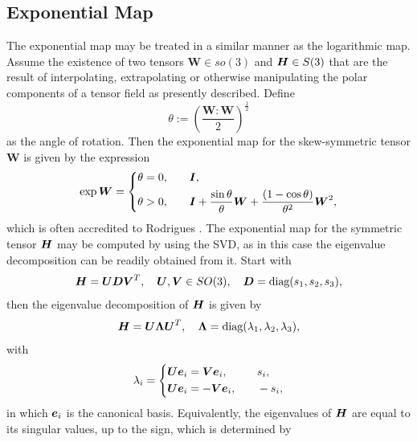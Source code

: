 \documentclass[12pt]{article}
\newcommand{\mbs}[1]{\boldsymbol{#1}}
\def\bD{{\mbs{D}}} \def\bE{{\mbs{E}}} \def\bF{{\mbs{F}}}
\def\bV{{\mbs{V}}} \def\bW{{\mbs{W}}} \def\bX{{\mbs{X}}}
\def\bLambda{{\mbs{\Lambda}}}
\begin{document}
\subsection{Exponential Map}

The exponential map may be treated in a similar manner as the logarithmic map.
Assume the existence of two tensors $\bW \in so(3)$ and $\bH \in S(3)$ that are the result of
interpolating, extrapolating or otherwise manipulating the polar components of a
tensor field as presently described. Define
\begin{equation}
  \theta := \left( \frac{\bW : \bW}{2} \right)^{\frac{1}{2}}
  \label{eq:angle-as-norm-skew}
\end{equation}
as the angle of rotation. Then the exponential map for the skew-symmetric tensor
$\bW$ is given by the expression
\begin{align}
  \exp \bW =
  \left\{
    \begin{aligned}
    & \theta = 0, & \quad & \bI,
    \\
    & \theta > 0, & \quad &
    \bI + \frac{\sin \theta}{\theta} \bW +
    \frac{(1 - \cos \theta)}{\theta^2} \bW^2,
    \end{aligned}
  \right.
  \label{eq:Rodrigues-formula}
\end{align}
which is often accredited to Rodrigues \citep{Gallier:2011}. The exponential map
for the symmetric tensor $\bH$ may be computed by using the SVD, as in
this case the eigenvalue decomposition can be readily obtained from it. Start
with
\begin{equation}
  \bH = \bU \bD \bV^T,
  \quad
  \bU, \bV \in SO(3),
  \quad
  \bD = \text{diag}(s_1,s_2,s_3),
  \label{eq:SVD-symmetric}
\end{equation}
then the eigenvalue decomposition of $\bH$ is given by
\begin{equation}
  \bH = \bU \bLambda \bU^T,
  \quad
  \bLambda = \text{diag}(\lambda_1,\lambda_2,\lambda_3),
  \label{eq:eigen-symmetric}
\end{equation}
with
\begin{align}
  \lambda_i =
  \left\{
    \begin{aligned}
    & \bU \be_i = \bV \be_i, & \quad & s_i,
    \\
    & \bU \be_i = - \bV \be_i, & \quad & -s_i,
    \end{aligned}
  \right.
  \label{eq:EW-from-SW}
\end{align}
in which $\be_i$ is the canonical basis. Equivalently, the eigenvalues of $\bH$
are equal to its singular values, up to the sign, which is determined by
\end{document}
